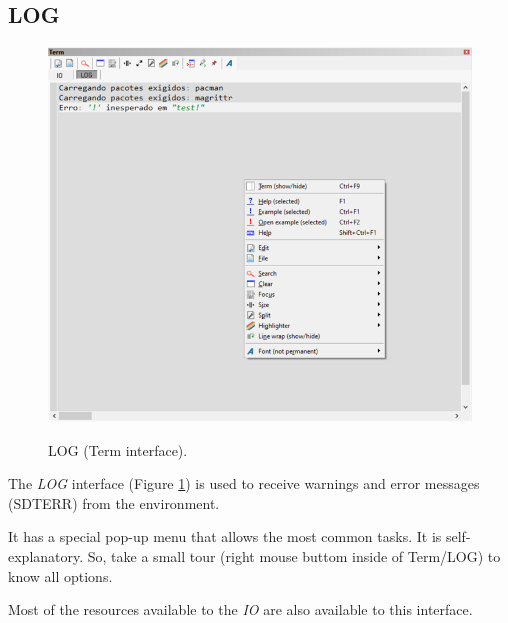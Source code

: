 \hypertarget{working_term_log}{}
\subsection{LOG}

 \begin{figure}[H]
  \includegraphics[width=\headwidth]{./res/term_log.png}\\
  \caption{LOG (Term interface).}
  \label{fig:term_log}
\end{figure}

The \textit{LOG} interface
(Figure \ref{fig:term_log})
is used to receive warnings and error messages (SDTERR) from the \RR{} environment.

It has a special pop-up menu that allows the most common tasks. It is
self-explanatory. So, take a small tour (right mouse buttom inside of
Term/LOG) to know all options.

Most of the resources available to the \textit{IO} are also available to this
interface.
